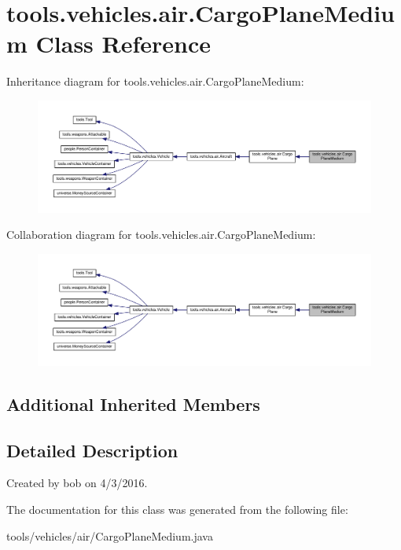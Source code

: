 \hypertarget{classtools_1_1vehicles_1_1air_1_1_cargo_plane_medium}{}\section{tools.\+vehicles.\+air.\+Cargo\+Plane\+Medium Class Reference}
\label{classtools_1_1vehicles_1_1air_1_1_cargo_plane_medium}


Inheritance diagram for tools.\+vehicles.\+air.\+Cargo\+Plane\+Medium\+:\nopagebreak
\begin{figure}[H]
\begin{center}
\leavevmode
\includegraphics[width=350pt]{classtools_1_1vehicles_1_1air_1_1_cargo_plane_medium__inherit__graph}
\end{center}
\end{figure}


Collaboration diagram for tools.\+vehicles.\+air.\+Cargo\+Plane\+Medium\+:\nopagebreak
\begin{figure}[H]
\begin{center}
\leavevmode
\includegraphics[width=350pt]{classtools_1_1vehicles_1_1air_1_1_cargo_plane_medium__coll__graph}
\end{center}
\end{figure}
\subsection*{Additional Inherited Members}


\subsection{Detailed Description}
Created by bob on 4/3/2016. 

The documentation for this class was generated from the following file\+:\begin{DoxyCompactItemize}
\item 
tools/vehicles/air/Cargo\+Plane\+Medium.\+java\end{DoxyCompactItemize}
